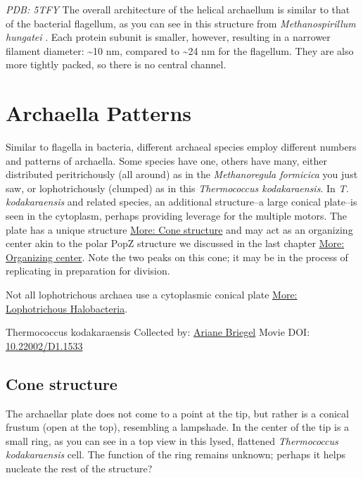 \documentclass[]{tufte-book}
\begin{document}
\emph{PDB: 5TFY}
The overall architecture of the helical archaellum is similar to that of the bacterial flagellum, as you can see in this structure from \emph{Methanospirillum hungatei} \citep{poweleit2016}. Each protein subunit is smaller, however, resulting in a narrower filament diameter: \textasciitilde{}10 nm, compared to \textasciitilde{}24 nm for the flagellum. They are also more tightly packed, so there is no central channel.

\hypertarget{archaella-patterns}{%
\section{Archaella Patterns}\label{archaella-patterns}}

Similar to flagella in bacteria, different archaeal species employ different numbers and patterns of archaella. Some species have one, others have many, either distributed peritrichously (all around) as in the \emph{Methanoregula formicica} you just saw, or lophotrichously (clumped) as in this \emph{Thermococcus kodakaraensis}. In \emph{T. kodakaraensis} and related species, an additional structure--a large conical plate--is seen in the cytoplasm, perhaps providing leverage for the multiple motors. The plate has a unique structure \protect\hyperlink{Cone_structure}{More: Cone structure} and may act as an organizing center akin to the polar PopZ structure we discussed in the last chapter \protect\hyperlink{Organizing_center}{More: Organizing center}. Note the two peaks on this cone; it may be in the process of replicating in preparation for division.

Not all lophotrichous archaea use a cytoplasmic conical plate \protect\hyperlink{Lophotrichous_Halobacteria}{More: Lophotrichous Halobacteria}.



\hypertarget{htmlwidget-467ac2e2161565be7112}{}

\label{fig:6-9}Thermococcus kodakaraensis Collected by: \protect\hyperlink{ariane_briegel}{Ariane Briegel} Movie DOI: \href{https://doi.org/10.22002/D1.1533}{10.22002/D1.1533}

\hypertarget{Cone_structure}{%
\subsection{Cone structure}\label{Cone_structure}}

The archaellar plate does not come to a point at the tip, but rather is a conical frustum (open at the top), resembling a lampshade. In the center of the tip is a small ring, as you can see in a top view in this lysed, flattened \emph{Thermococcus kodakaraensis} cell. The function of the ring remains unknown; perhaps it helps nucleate the rest of the structure?
\end{document}
